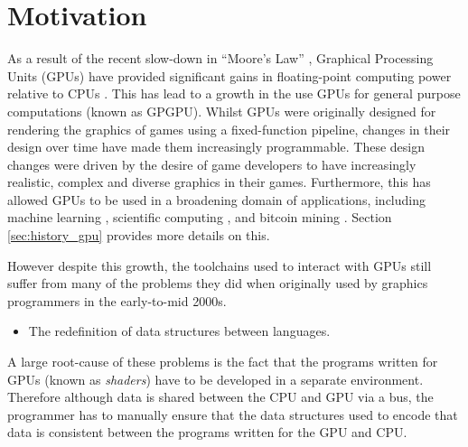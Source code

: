 \documentclass[a4paper,12pt,twoside,openright]{report}
\begin{document}
\section{Motivation}


As a result of the recent slow-down in ``Moore's Law'' \cite{MooreLawSlowdown},
Graphical Processing Units (GPUs) have provided significant gains in
floating-point computing power relative to CPUs \cite{CPUGPUOverTime}. This has
lead to a growth in the use GPUs for general purpose computations (known as
GPGPU). Whilst GPUs were originally designed for rendering the graphics of
games using a fixed-function pipeline, changes in their design over time have
made them increasingly programmable. These design changes were driven by the
desire of game developers to have increasingly realistic, complex and diverse
graphics in their games. Furthermore, this has allowed GPUs to be used in a
broadening domain of applications, including machine learning \cite{TODO},
scientific computing \cite{TODO}, and bitcoin mining \cite{TODO}. Section
\ref{sec:history_gpu} provides more details on this.

However despite this growth, the toolchains used to interact with GPUs still
suffer from many of the problems they did when originally used by graphics
programmers in the early-to-mid 2000s.

\begin{itemize}

    \item The redefinition of data structures between languages.

\end{itemize}

A large root-cause of these problems is the fact that the programs written for
GPUs (known as \textit{shaders}) have to be developed in a separate
environment. Therefore although data is shared between the CPU and GPU via a
bus, the programmer has to manually ensure that the data structures used to
encode that data is consistent between the programs written for the GPU and
CPU.
\end{document}
